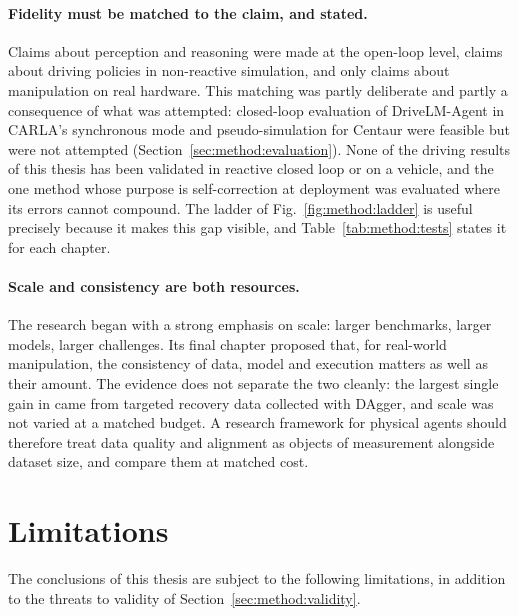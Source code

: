 \paragraph{Fidelity must be matched to the claim, and stated.} Claims about perception and reasoning were made at the open-loop level, claims about driving policies in non-reactive simulation, and only claims about manipulation on real hardware. This matching was partly deliberate and partly a consequence of what was attempted: closed-loop evaluation of DriveLM-Agent in CARLA's synchronous mode and pseudo-simulation for Centaur were feasible but were not attempted (Section~\ref{sec:method:evaluation}). None of the driving results of this thesis has been validated in reactive closed loop or on a vehicle, and the one method whose purpose is self-correction at deployment was evaluated where its errors cannot compound. The ladder of Fig.~\ref{fig:method:ladder} is useful precisely because it makes this gap visible, and Table~\ref{tab:method:tests} states it for each chapter.

\paragraph{Scale and consistency are both resources.} The research began with a strong emphasis on scale: larger benchmarks, larger models, larger challenges. Its final chapter proposed that, for real-world manipulation, the consistency of data, model and execution matters as well as their amount. The evidence does not separate the two cleanly: the largest single gain in \chiz came from targeted recovery data collected with DAgger, and scale was not varied at a matched budget. A research framework for physical agents should therefore treat data quality and alignment as objects of measurement alongside dataset size, and compare them at matched cost.

\section{Limitations}\label{sec:disc:limits}

The conclusions of this thesis are subject to the following limitations, in addition to the threats to validity of Section~\ref{sec:method:validity}.

